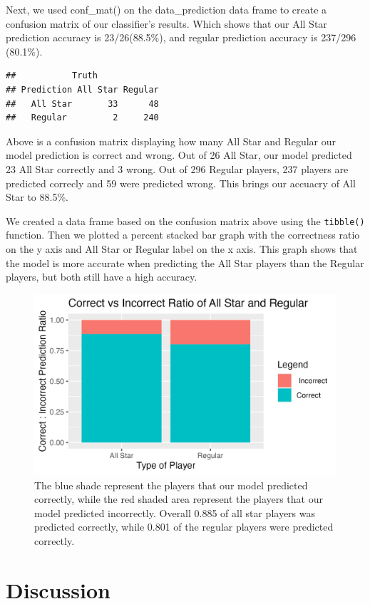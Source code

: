 \documentclass[
]{article}
\begin{document}
Next, we used conf\_mat() on the data\_prediction data frame to create a confusion matrix of our classifier's results. Which shows that our All Star prediction accuracy is 23/26(88.5\%), and regular prediction accuracy is 237/296 (80.1\%).

\begin{verbatim}
##           Truth
## Prediction All Star Regular
##   All Star       33      48
##   Regular         2     240
\end{verbatim}

Above is a confusion matrix displaying how many All Star and Regular our model prediction is correct and wrong. Out of 26 All Star, our model predicted 23 All Star correctly and 3 wrong. Out of 296 Regular players, 237 players are predicted correcly and 59 were predicted wrong. This brings our accuacry of All Star to 88.5\%.

We created a data frame based on the confusion matrix above using the \texttt{tibble()} function. Then we plotted a percent stacked bar graph with the correctness ratio on the y axis and All Star or Regular label on the x axis. This graph shows that the model is more accurate when predicting the All Star players than the Regular players, but both still have a high accuracy.

\begin{figure}
\includegraphics[width=0.8\linewidth]{results/confusion_graph} \caption{The blue shade represent the players that our model predicted correctly, while the red shaded area represent the players that our model predicted incorrectly. Overall 0.885 of all star players was predicted correctly, while 0.801 of the regular players were predicted correctly.}\label{fig:fig2}
\end{figure}

\hypertarget{discussion}{%
\section{Discussion}\label{discussion}}
\end{document}
